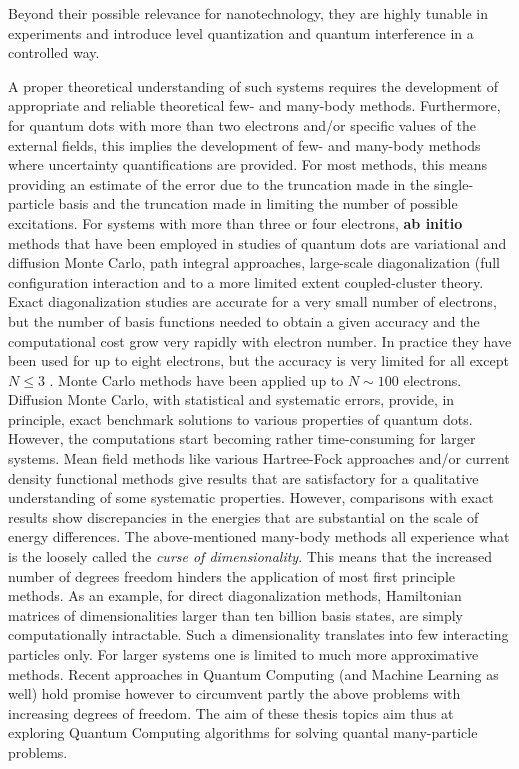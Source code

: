 \documentclass[%
oneside,                 %
final,                   %
10pt]{article}
\begin{document}
Beyond their possible relevance for
nanotechnology, they are highly tunable in experiments and introduce
level quantization and quantum interference in a controlled way. 

A proper theoretical understanding of such systems
requires the development of appropriate and reliable theoretical
few- and many-body methods.  Furthermore, for quantum dots with more
than two electrons and/or specific values of the external fields, this
implies the development of few- and many-body methods where
uncertainty quantifications are provided.  For most methods, this
means providing an estimate of the error due to the truncation made in
the single-particle basis and the truncation made in limiting the
number of possible excitations.  For systems with more than three or
four electrons, \textbf{ab initio} methods that have been employed in
studies of quantum dots are variational and diffusion Monte Carlo, path integral approaches, large-scale diagonalization (full configuration
interaction and to a more
limited extent coupled-cluster theory.
Exact diagonalization studies are accurate for a very small number of
electrons, but the number of basis functions needed to obtain a given
accuracy and the computational cost grow very rapidly with electron
number.  In practice they have been used for up to eight
electrons, but the accuracy is very
limited for all except $N\le 3$ .  Monte Carlo methods have been
applied up to $N\sim 100$ electrons. Diffusion Monte Carlo, with
statistical and systematic errors, provide, in principle, exact
benchmark solutions to various properties of quantum dots. However,
the computations start becoming rather time-consuming for larger
systems.  Mean field methods like various Hartree-Fock approaches and/or 
current density functional
methods give results that are
satisfactory for a qualitative understanding of some systematic
properties. However, comparisons with exact results show discrepancies
in the energies that are substantial on the scale of energy
differences. The above-mentioned many-body methods all experience what is the loosely called the \emph{curse of dimensionality}. This means that the increased number of degrees freedom hinders the application of most first principle methods. As an example, for direct diagonalization methods, Hamiltonian matrices of dimensionalities larger than ten billion basis states, are simply computationally intractable. Such a dimensionality translates into few interacting particles only. For larger systems one is limited to much more approximative methods. 
Recent approaches in Quantum Computing (and Machine Learning as well) hold promise however to circumvent partly the above problems with increasing degrees of freedom. 
The aim of these thesis topics aim thus at exploring Quantum Computing algorithms for solving quantal many-particle problems. 
\end{document}
